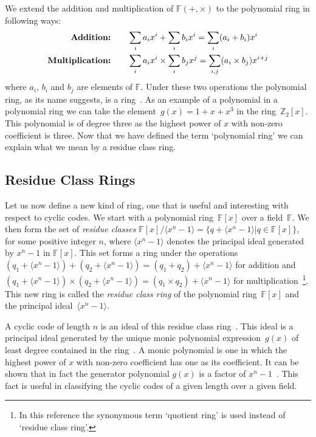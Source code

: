 We extend the addition and multiplication of $\mathbb{F}(+,\times)$ to the polynomial ring in following ways:
\begin{align*}
	\textrm{\textbf{Addition:}} \qquad \displaystyle &\sum_i a_i x^i + \sum_i b_i x^i = \sum_i (a_i + b_i ) x^i\\
	\textrm{\textbf{Multiplication:}} \qquad \displaystyle &\sum_i a_i x^i \times \sum_i b_j x^j = \sum_{i,j} (a_i \times b_j) x^{i+j}
\end{align*}
where $a_i$, $b_i$ and $b_j$ are elements of $\mathbb{F}$.
Under these two operations the polynomial ring, as its name suggests, is a ring~\cite[p.~109]{mac99}.
As an example of a polynomial in a polynomial ring we can take the element~$g(x) = 1 + x + x^3$ in the ring~$\mathbb{Z}_2 [x]$.
This polynomial is of degree three as the highest power of $x$ with non-zero coefficient is three.
Now that we have defined the term `polynomial ring' we can explain what we mean by a residue class ring.

\subsection{Residue Class Rings}
Let us now define a new kind of ring, one that is useful and interesting with respect to cyclic codes.
We start with a polynomial ring~$\mathbb{F}[x]$ over a field~$\mathbb{F}$.
We then form the set of \emph{residue classes} $\mathbb{F}[x] / \langle x^n-1 \rangle = \{ q + \langle x^n-1 \rangle | q \in \mathbb{F}[x] \}$, for some positive integer $n$, where $\langle x^n-1 \rangle$ denotes the principal ideal generated by $x^n - 1$ in $\mathbb{F}[x]$.
This set forms a ring under the operations $(q_1 + \langle x^n - 1 \rangle) + (q_2 + \langle x^n - 1 \rangle) = ( q_1 + q_2 ) + \langle x^n - 1 \rangle$ for addition and $(q_1 + \langle x^n - 1 \rangle) \times (q_2 + \langle x^n - 1 \rangle) = ( q_1 \times q_2 ) + \langle x^n - 1 \rangle$ for multiplication~\cite[p.~96]{mac99}\footnote{In this reference the synonymous term `quotient ring' is used instead of `residue class ring'.}.
This new ring is called the \emph{residue class ring} of the polynomial ring~$\mathbb{F}[x]$ and the principal ideal~$ \langle x^n-1 \rangle$.

A cyclic code of length $n$ is an ideal of this residue class ring~\cite[p.~126]{huf03}.
This ideal is a principal ideal generated by the unique monic polynomial expression~$g(x)$ of least degree contained in the ring~\cite[p.~125]{huf03}.
A monic polynomial is one in which the highest power of $x$ with non-zero coefficient has one as its coefficient.
It can be shown that in fact the generator polynomial $g(x)$ is a factor of $x^n - 1$~\cite[p.~126]{huf03}.
This fact is useful in classifying the cyclic codes of a given length over a given field.

